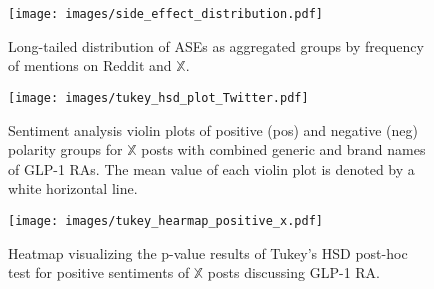 \documentclass[referee,bst/sn-basic]{sn-jnl}%
\theoremstyle{thmstyletwo}%
\theoremstyle{thmstylethree}%
\begin{document}
\begin{sidewaysfigure}
    \centering
    \texttt{[image: images/side\_effect\_distribution.pdf]}
    \caption{Long-tailed distribution of ASEs as aggregated groups by frequency of mentions on Reddit and $\mathbb{X}$.
             }
    \label{fig:ASE_mention}
\end{sidewaysfigure}



\begin{figure}[H]
    \centering
    \texttt{[image: images/tukey\_hsd\_plot\_Twitter.pdf]}
    \caption{Sentiment analysis violin plots of positive (pos) and negative (neg) polarity groups for $\mathbb{X}$ posts with combined generic and brand names of GLP-1 RAs.
             The mean value of each violin plot is denoted by a white horizontal line.}
    \label{fig:sentiment}
\end{figure}



 \begin{figure}[H]
    \centering
    \texttt{[image: images/tukey\_hearmap\_positive\_x.pdf]}
    \caption{Heatmap visualizing the p-value results of Tukey’s HSD post-hoc test for positive sentiments of $\mathbb{X}$ posts discussing GLP-1 RA.}
    \label{fig:heatmap_pos}
\end{figure}
\end{document}
